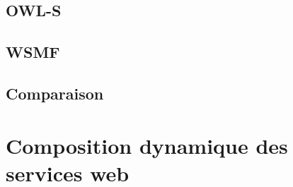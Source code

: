 


    \subsection{OWL-S}
    \label{sec:owl-s}
    \cite{mcilraith2003bringing}

    \subsection{WSMF}
    \label{sec:wsmf}    

    \subsection{Comparaison}
    \label{sec:langs-comparaison}   
  \section{Composition dynamique des services web}
  \label{sec:comp-dynam}

